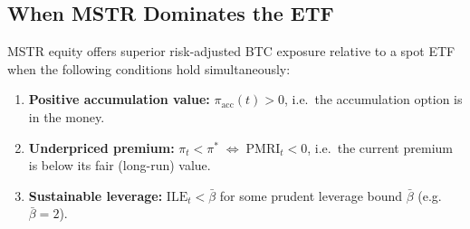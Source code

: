 \subsection{When MSTR Dominates the ETF}

\begin{proposition}\label{prop:mstr-dominates}
MSTR equity offers superior risk-adjusted BTC exposure relative to a
spot ETF when the following conditions hold simultaneously:
\begin{enumerate}
  \item \textbf{Positive accumulation value:} $\pi_{\mathrm{acc}}(t) > 0$,
    i.e.\ the accumulation option is in the money.
  \item \textbf{Underpriced premium:}
    $\pi_t < \pi^* \;\Leftrightarrow\; \mathrm{PMRI}_t < 0$,
    i.e.\ the current premium is below its fair (long-run) value.
  \item \textbf{Sustainable leverage:}
    $\mathrm{ILE}_t < \bar\beta$ for some prudent leverage bound
    $\bar\beta$ (e.g.\ $\bar\beta = 2$).
\end{enumerate}
\end{proposition}

